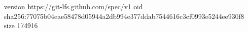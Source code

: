 version https://git-lfs.github.com/spec/v1
oid sha256:77075b04eae58478d05944a2db994e377ddab7544616c3cf0993e5244ee930f8
size 174916
